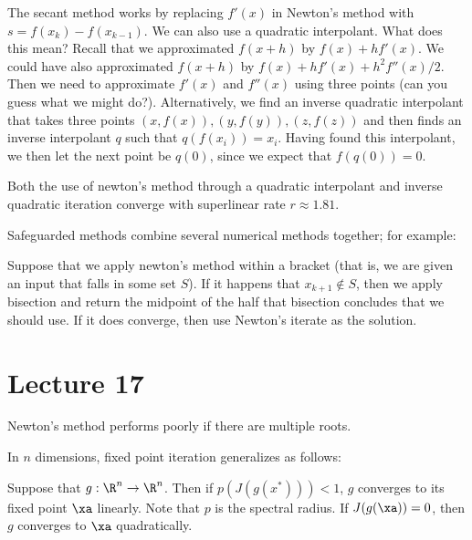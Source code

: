 \documentclass[../main.tex]{subfiles}
\begin{document}
\begin{definition}
    The secant method works by replacing $f'(x)$ in Newton's method with $s = f(x_k) - f(x_{k-1})$. We can also use a quadratic interpolant. What does this mean?
    Recall that we approximated $f(x+h)$ by $f(x) + hf'(x)$. We could have also approximated $f(x+h)$ by $f(x) + hf'(x) + h^2f''(x)/2$. Then we need to approximate $f'(x)$ and $f''(x)$ using three points (can you guess what we might do?). Alternatively, we find an inverse quadratic interpolant that takes three points $(x,f(x)), (y, f(y)), (z, f(z))$ and then finds an inverse interpolant $q$ such that $q(f(x_i)) = x_i$. Having found this interpolant, we then let the next point be $q(0)$, since we expect that $f(q(0)) = 0$.
\end{definition}


\begin{remark}
    Both the use of newton's method through a quadratic interpolant and inverse quadratic iteration converge with superlinear rate $r \approx 1.81$.
\end{remark}

\begin{remark}
    Safeguarded methods combine several numerical methods together; for example:

    Suppose that we apply newton's method within a bracket (that is, we are given an input that falls in some set $S$). If it happens that $x_{k+1} \not \in S$, then we apply bisection and return the midpoint of the half that bisection concludes that we should use. If it does converge, then use Newton's iterate as the solution.


\end{remark}

\section{Lecture 17}

\begin{remark}
    Newton's method performs poorly if there are multiple roots.
\end{remark}

\begin{definition}
    In $n$ dimensions, fixed point iteration generalizes as follows:

    \begin{outline}
        \1 Suppose that $g: \R^n \to \R^n$. Then if $p(J(g(x^{*}))) < 1$, $g$ converges to its fixed point $\xa$ linearly. Note that $p$ is the spectral radius.
        \1 If $J(g(\xa)) = 0$, then $g$ converges to $\xa$ quadratically.
    \end{outline}
\end{definition}
\end{document}
